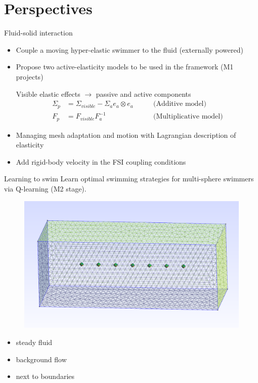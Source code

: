 \documentclass{beamer}
\begin{document}
	\section{Perspectives}
	\begin{frame}{Fluid-solid interaction}
		\begin{itemize}
			\item Couple a moving hyper-elastic swimmer to the fluid (externally powered)
			\item Propose two active-elasticity models to be used in the framework (M1 projects)
			
			Visible elastic effects $\to$ passive and active components
			\begin{equation*}
				\begin{aligned}
					\Sigma_p &= \Sigma_{visible}-\Sigma_a e_a\otimes e_a \qquad &\text{(Additive model)}\\
					F_p &= F_{visible}F_a^{-1} \qquad &\text{(Multiplicative model)}
				\end{aligned}
			\end{equation*}
		\item Managing mesh adaptation and motion with Lagrangian description of elasticity
		\item Add rigid-body velocity in the FSI coupling conditions
		\end{itemize}
	\end{frame}
	\begin{frame}{Learning to swim}
		Learn optimal swimming strategies for multi-sphere swimmers via Q-learning (M2 stage).
		\begin{figure}
			\centering
			\includegraphics[width=0.5\linewidth]{figures/Multisphere.png}
		\end{figure}
	\begin{itemize}
		\item steady fluid
		\item background flow
		\item next to boundaries
	\end{itemize}
	\end{frame}
\end{document}
